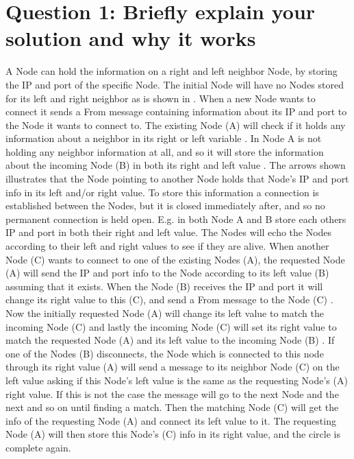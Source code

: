 \section{Question 1: Briefly explain your solution and why it works}
A Node can hold the information on a right and left neighbor Node, by storing the IP and port of the specific Node.
The initial Node will have no Nodes stored for its left and right neighbor as is shown in .
When a new Node wants to connect it sends a From message containing information about its IP and port to the Node it wants to connect to. The existing Node (A) will check if it holds any information about a neighbor in its right or left variable .  
In  Node A is not holding any neighbor information at all, and so it will store the information about the incoming Node (B) in both its right and left value . The arrows shown illustrates that the Node pointing to another Node holds that Node's IP and port info in its left and/or right value. To store this information a connection is established between the Nodes, but it is closed immediately after, and  so no permanent connection is held open. E.g. in  both Node A and B store each others IP and port in both their right and left value. The Nodes will echo the Nodes according to their left and right values to see if they are alive.
When another Node (C) wants to connect to one of the existing Nodes (A), the requested Node (A) will send the IP and port info to the Node according to its left value (B) assuming that it exists. When the Node (B) receives the IP and port it will change its right value to this (C), and send a From message to the Node (C) .
 Now the initially requested Node (A) will change its left value to match the incoming Node (C) and lastly the incoming Node (C) will set its right value to match the requested Node (A) and its left value to the incoming Node (B) .
 \pagebreak
{}
If one of the Nodes (B) disconnects, the Node which is connected to this node through its right value (A) will send a message to its neighbor Node (C) on the left value asking if this Node's left value is the same as the requesting Node's (A) right value. If this is not the case the message will go to the next Node and the next and so on until finding a match. Then the matching Node (C) will get the info of the requesting Node (A) and connect its left value to it. The requesting Node (A) will then store this Node's (C) info in its right value, and the circle is complete again.